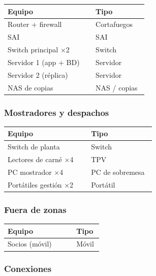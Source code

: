 {\small
\begin{longtable}{@{}>{\raggedright\arraybackslash}p{0.596\linewidth}>{\raggedright\arraybackslash}p{0.353\linewidth}@{}}
\toprule
\textbf{Equipo} & \textbf{Tipo} \\
\midrule
\endhead
Router + firewall & Cortafuegos \\
SAI & SAI \\
Switch principal ×2 & Switch \\
Servidor 1 (app + BD) & Servidor \\
Servidor 2 (réplica) & Servidor \\
NAS de copias & NAS / copias \\
\bottomrule
\end{longtable}}

\subsubsection*{Mostradores y despachos}

{\small
\begin{longtable}{@{}>{\raggedright\arraybackslash}p{0.534\linewidth}>{\raggedright\arraybackslash}p{0.415\linewidth}@{}}
\toprule
\textbf{Equipo} & \textbf{Tipo} \\
\midrule
\endhead
Switch de planta & Switch \\
Lectores de carné ×4 & TPV \\
PC mostrador ×4 & PC de sobremesa \\
Portátiles gestión ×2 & Portátil \\
\bottomrule
\end{longtable}}

\subsubsection*{Fuera de zonas}

{\small
\begin{longtable}{@{}>{\raggedright\arraybackslash}p{0.686\linewidth}>{\raggedright\arraybackslash}p{0.263\linewidth}@{}}
\toprule
\textbf{Equipo} & \textbf{Tipo} \\
\midrule
\endhead
Socios (móvil) & Móvil \\
\bottomrule
\end{longtable}}

\subsubsection*{Conexiones}

